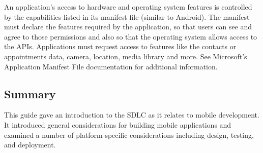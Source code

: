 \begin{itemize}
An application’s access to hardware and operating system features is controlled by the capabilities listed in its manifest file (similar to Android). The manifest must declare the features required by the application, so that users can see and agree to those permissions and also so that the operating system allows access to the APIs. Applications must request access to features like the contacts or appointments data, camera, location, media library and more. See Microsoft’s Application Manifest File documentation for additional information.

\end{itemize}

\subsection{Summary}

This guide gave an introduction to the SDLC as it relates to mobile development. It introduced general considerations for building mobile applications and examined a number of platform-specific considerations including design, testing, and deployment.

